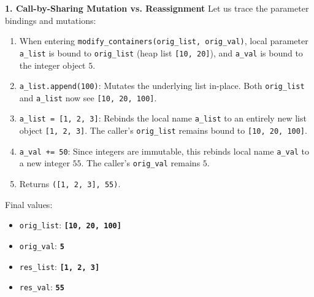 \textbf{1. Call-by-Sharing Mutation vs. Reassignment}
Let us trace the parameter bindings and mutations:
\begin{enumerate}
    \item When entering \texttt{modify\_containers(orig\_list, orig\_val)}, local parameter \texttt{a\_list} is bound to \texttt{orig\_list} (heap list \texttt{[10, 20]}), and \texttt{a\_val} is bound to the integer object $5$.
    \item \texttt{a\_list.append(100)}: Mutates the underlying list in-place. Both \texttt{orig\_list} and \texttt{a\_list} now see \texttt{[10, 20, 100]}.
    \item \texttt{a\_list = [1, 2, 3]}: Rebinds the local name \texttt{a\_list} to an entirely new list object \texttt{[1, 2, 3]}. The caller's \texttt{orig\_list} remains bound to \texttt{[10, 20, 100]}.
    \item \texttt{a\_val += 50}: Since integers are immutable, this rebinds local name \texttt{a\_val} to a new integer $55$. The caller's \texttt{orig\_val} remains $5$.
    \item Returns \texttt{([1, 2, 3], 55)}.
\end{enumerate}
Final values:
\begin{itemize}
    \item \texttt{orig\_list}: \textbf{\texttt{[10, 20, 100]}}
    \item \texttt{orig\_val}: \textbf{\texttt{5}}
    \item \texttt{res\_list}: \textbf{\texttt{[1, 2, 3]}}
    \item \texttt{res\_val}: \textbf{\texttt{55}}
\end{itemize}

